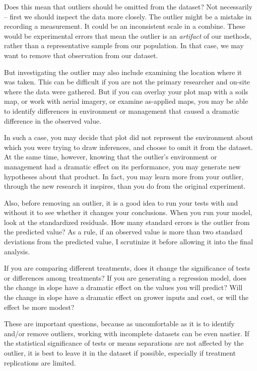 \documentclass[
]{book}
\begin{document}
Does this mean that outliers should be omitted from the dataset? Not necessarily -- first we should inspect the data more closely. The outlier might be a mistake in recording a measurement. It could be an inconsistent scale in a combine. These would be experimental errors that mean the outlier is an \emph{artifact} of our methods, rather than a representative sample from our population. In that case, we may want to remove that observation from our dataset.

But investigating the outlier may also include examining the location where it was taken. This can be difficult if you are not the primary researcher and on-site where the data were gathered. But if you can overlay your plot map with a soils map, or work with aerial imagery, or examine as-applied maps, you may be able to identify differences in environment or management that caused a dramatic difference in the observed value.

In such a case, you may decide that plot did not represent the environment about which you were trying to draw inferences, and choose to omit it from the dataset. At the same time, however, knowing that the outlier's environment or management had a dramatic effect on its performance, you may generate new hypotheses about that product. In fact, you may learn more from your outlier, through the new research it inspires, than you do from the original experiment.

Also, before removing an outlier, it is a good idea to run your tests with and without it to see whether it changes your conclusions. When you run your model, look at the standardized residuals. How many standard errors is the outlier from the predicted value? As a rule, if an observed value is more than two standard deviations from the predicted value, I scrutinize it before allowing it into the final analysis.

If you are comparing different treatments, does it change the significance of tests or differences among treatments? If you are generating a regression model, does the change in slope have a dramatic effect on the values you will predict? Will the change in slope have a dramatic effect on grower inputs and cost, or will the effect be more modest?

These are important questions, because as uncomfortable as it is to identify and/or remove outliers, working with incomplete datasets can be even nastier. If the statistical significance of tests or means separations are not affected by the outlier, it is best to leave it in the dataset if possible, especially if treatment replications are limited.
\end{document}
